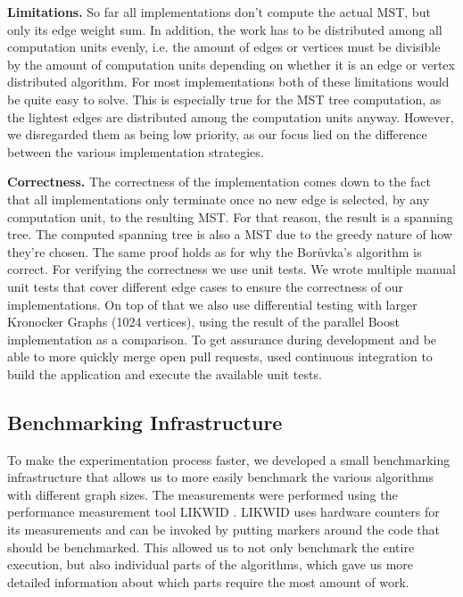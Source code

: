 \documentclass[letterpaper]{article}
\newcommand{\mypar}[1]{{\bf #1.}}
\begin{document}
\mypar{Limitations}
So far all implementations don't compute the actual MST, but only its edge weight sum. In addition, the work has to be
distributed among all computation units evenly, i.e. the amount of edges or vertices must be divisible by the amount of
computation units depending on whether it is an edge or vertex distributed algorithm. For most implementations both of
these limitations would be quite easy to solve. This is especially true for the MST tree computation, as the lightest
edges are distributed among the computation units anyway. However, we disregarded them as being low priority, as our
focus lied on the difference between the various implementation strategies.

\mypar{Correctness}
The correctness of the implementation comes down to the fact that all implementations only terminate once no new edge is
selected, by any computation unit, to the resulting MST. For that reason, the result is a spanning tree. The computed
spanning tree is also a MST due to the greedy nature of how they're chosen. The same proof holds as for why the
Bor\r{u}vka's algorithm is correct\cite{nevsetvril2012origins}. For verifying the correctness we use unit tests. We
wrote multiple manual unit tests that cover different edge cases to ensure the correctness of our implementations. On
top of that we also use differential testing with larger Kronocker Graphs (1024 vertices), using the result of the
parallel Boost implementation as a comparison. To get assurance during development and be able to more quickly merge
open pull requests, used continuous integration to build the application and execute the available unit tests.

\subsection{Benchmarking Infrastructure}
To make the experimentation process faster, we developed a small benchmarking infrastructure that allows us to more
easily benchmark the various algorithms with different graph sizes. The measurements were performed using the
performance measurement tool LIKWID \cite{treibig2010likwid}. LIKWID uses hardware counters for its measurements and can
be invoked by putting markers around the code that should be benchmarked. This allowed us to not only benchmark the
entire execution, but also individual parts of the algorithms, which gave us more detailed information about which parts
require the most amount of work.
\end{document}

